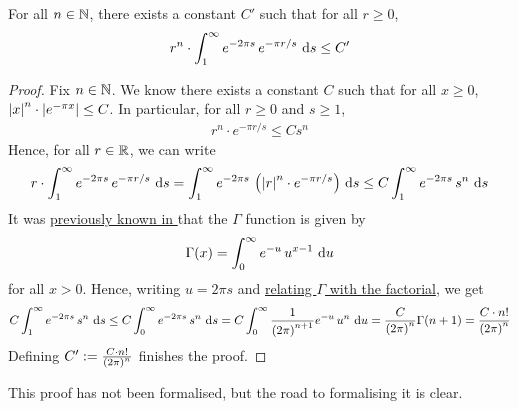 \begin{boxlemma}\label{Ch4:Lemma:Bessel_Bound}
    For all $n \in \mathbb{N}$, there exists a constant $C'$ such that for all $r \geq 0$,
    \begin{align*}
        r^n \cdot \int_{1}^{\infty} e^{-2\pi s} \, e^{-\pi r /s} \, \operatorname{d}\!{s} \leq C'
    \end{align*}
\end{boxlemma}
\begin{proof}
    Fix $n \in \mathbb{N}$. We know there exists a constant $C$ such that for all $x \geq 0$, $\left\lvert x \right\rvert^n \cdot \left\lvert e^{-\pi x} \right\rvert \leq C$. In particular, for all $r \geq 0$ and $s \geq 1$,
    \begin{align*}
        r^n \cdot e^{-\pi r/s} \leq C s^n
    \end{align*}
    Hence, for all $r \in \mathbb{R}$, we can write
    \begin{align*}
        r \cdot \int_{1}^{\infty} e^{-2\pi s} \, e^{-\pi r /s} \, \operatorname{d}\!{s}
        = \int_{1}^{\infty} e^{-2\pi s} \, \left( \left\lvert r \right\rvert^n \cdot e^{-\pi r /s} \right) \, \operatorname{d}\!{s}
        \leq C \int_{1}^{\infty} e^{-2\pi s} \, s^n \, \operatorname{d}\!{s}
    \end{align*}
    It was \href{https://github.com/leanprover-community/mathlib4/blob/5a2eaa85c555c4263e15928cef249cbaad2eb2d2/Mathlib/Analysis/SpecialFunctions/Gamma/Basic.lean#L403}{previously known in \mathlib} that the $\Gamma$ function is given by
    \begin{align*}
        \Gamma(x) = \int_{0}^{\infty} e^{-u} \, u^{x-1} \, \operatorname{d}\!{u}
    \end{align*}
    for all $x > 0$. Hence, writing $u = 2\pi s$ and \href{https://github.com/leanprover-community/mathlib4/blob/5a2eaa85c555c4263e15928cef249cbaad2eb2d2/Mathlib/Analysis/SpecialFunctions/Gamma/Basic.lean#L430}{relating $\Gamma$ with the factorial}, we get
    \begin{align*}
        C \int_{1}^{\infty} e^{-2\pi s} \, s^n \, \operatorname{d}\!{s}
        \leq C \int_{0}^{\infty} e^{-2\pi s} \, s^n \, \operatorname{d}\!{s}
        = C \int_{0}^{\infty} \frac{1}{\left( 2\pi \right)^{n+1}} e^{-u} \, u^n \, \operatorname{d}\!{u}
        = \frac{C}{\left( 2\pi \right)^n} \Gamma\!\left( n + 1 \right)
        = \frac{C \cdot n!}{\left( 2\pi \right)^n}
    \end{align*}
    Defining $C' := \frac{C \cdot n!}{\left( 2\pi \right)^n}$ finishes the proof.
\end{proof}

This proof has not been formalised, but the road to formalising it is clear.

